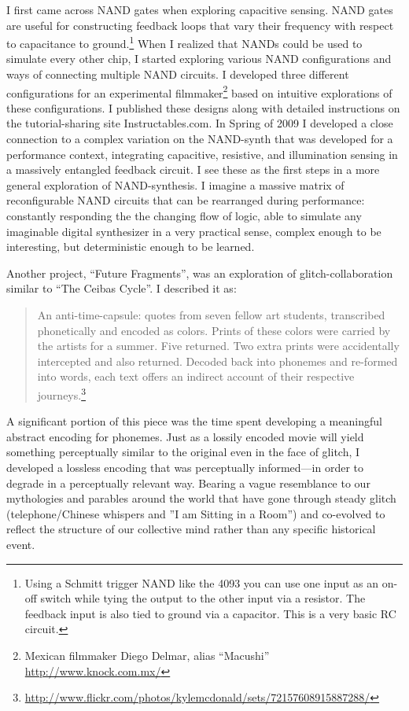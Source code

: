 \documentclass{thesis}
\begin{document}
	I first came across NAND gates when exploring capacitive sensing. NAND gates are useful for constructing feedback loops that vary their frequency with respect to capacitance to ground.\footnote{Using a Schmitt trigger NAND like the 4093 you can use one input as an on-off switch while tying the output to the other input via a resistor. The feedback input is also tied to ground via a capacitor. This is a very basic RC circuit.} When I realized that NANDs could be used to simulate every other chip, I started exploring various NAND configurations and ways of connecting multiple NAND circuits. I developed three different configurations for an experimental filmmaker\footnote{Mexican filmmaker Diego Delmar, alias ``Macushi'' \url{http://www.knock.com.mx/}} based on intuitive explorations of these configurations. I published these designs along with detailed instructions on the tutorial-sharing site Instructables.com. In Spring of 2009 I developed a close connection to a complex variation on the NAND-synth that was developed for a performance context, integrating capacitive, resistive, and illumination sensing in a massively entangled feedback circuit. I see these as the first steps in a more general exploration of NAND-synthesis. I imagine a massive matrix of reconfigurable NAND circuits that can be rearranged during performance: constantly responding the the changing flow of logic, able to simulate any imaginable digital synthesizer in a very practical sense, complex enough to be interesting, but deterministic enough to be learned.
	
	Another project, ``Future Fragments'', was an exploration of glitch-collaboration similar to ``The Ceibas Cycle''. I described it as:
	
	\begin{quote}
	An anti-time-capsule: quotes from seven fellow art students, transcribed phonetically and encoded as colors. Prints of these colors were carried by the artists for a summer. Five returned. Two extra prints were accidentally intercepted and also returned. Decoded back into phonemes and re-formed into words, each text offers an indirect account of their respective journeys.\footnote{\url{http://www.flickr.com/photos/kylemcdonald/sets/72157608915887288/}}
	\end{quote}
	
	A significant portion of this piece was the time spent developing a meaningful abstract encoding for phonemes. Just as a lossily encoded movie will yield something perceptually similar to the original even in the face of glitch, I developed a lossless encoding that was perceptually informed---in order to degrade in a perceptually relevant way. Bearing a vague resemblance to our mythologies and parables around the world that have gone through steady glitch (telephone/Chinese whispers and ''I am Sitting in a Room'') and co-evolved to reflect the structure of our collective mind rather than any specific historical event.
\end{document}
